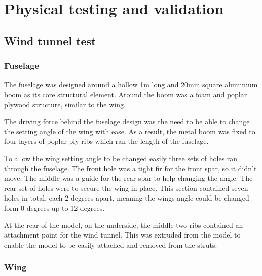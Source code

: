\documentclass[../../main.tex]{subfiles}
\begin{document}
\section{Physical testing and validation} \label{sec:design-process:physical-testing-and-validation}

\subsection{Wind tunnel test} \label{sec:design-process:interim-design-review:wind-tunnel-test}

\subsubsection{Fuselage} \label{sec:design-process:interim-design-review:wind-tunnel-test:fuselage}

The fuselage was designed around a hollow 1m long and 20mm square aluminium boom as its core structural element.
Around the boom was a foam and poplar plywood structure, similar to the wing. 

The driving force behind the fuselage design was the need to be able to change the setting angle of the wing with ease.
As a result, the metal boom was fixed to four layers of poplar ply ribs which ran the length of the fuselage. 

To allow the wing setting angle to be changed easily three sets of holes ran through the fuselage.
The front hole was a tight fir for the front spar, so it didn’t move.
The middle was a guide for the rear spar to help changing the angle.
The rear set of holes were to secure the wing in place.
This section contained seven holes in total, each 2 degrees apart, meaning the wings angle could be changed form 0 degrees up to 12 degrees. 


At the rear of the model, on the underside, the middle two ribs contained an attachment point for the wind tunnel.
This was extruded from the model to enable the model to be easily attached and removed from the struts. 


\subsubsection{Wing} \label{sec:design-process:interim-design-review:wind-tunnel-test:wing}
\end{document}
